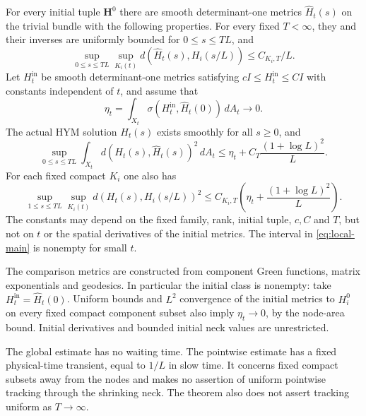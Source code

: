 \begin{theorem}\label{thm:main}
For every initial tuple $\mathbf H^0$ there are smooth determinant-one
metrics $\widehat H_t(s)$ on the trivial bundle with the following
properties. For every fixed $T<\infty$, they and their inverses are
uniformly bounded for $0\le s\le TL$, and
\begin{equation}\label{eq:approx-thick-intro}
 \sup_{0\le s\le TL}\sup_{K_i(t)}
 d(\widehat H_t(s),H_i(s/L))\le C_{K_i,T}/L.
\end{equation}
Let $H_t^{\mathrm{in}}$ be smooth determinant-one metrics satisfying
$cI\le H_t^{\mathrm{in}}\le CI$ with constants independent of $t$, and
assume that
\[
 \eta_t=\int_{X_t}\sigma(H_t^{\mathrm{in}},\widehat H_t(0))\,dA_t
 \longrightarrow0.
\]
The actual HYM solution $H_t(s)$ exists smoothly for all $s\ge0$, and
\begin{equation}\label{eq:global-main}
 \sup_{0\le s\le TL}\int_{X_t}d(H_t(s),\widehat H_t(s))^2\,dA_t
 \le\eta_t+C_T\frac{(1+\log L)^2}{L}.
\end{equation}
For each fixed compact $K_i$ one also has
\begin{equation}\label{eq:local-main}
 \sup_{1\le s\le TL}\sup_{K_i(t)}d(H_t(s),H_i(s/L))^2
 \le C_{K_i,T}\left(\eta_t+\frac{(1+\log L)^2}{L}\right).
\end{equation}
The constants may depend on the fixed family, rank, initial tuple,
$c,C$ and $T$, but not on $t$ or the spatial derivatives of the initial
metrics. The interval in \eqref{eq:local-main} is nonempty for small $t$.
\end{theorem}

The comparison metrics are constructed from component Green functions,
matrix exponentials and geodesics. In particular the initial class is
nonempty: take $H_t^{\mathrm{in}}=\widehat H_t(0)$. Uniform bounds and
$L^2$ convergence of the initial metrics to $H_i^0$ on every fixed
compact component subset also imply $\eta_t\to0$, by the node-area bound.
Initial derivatives and bounded initial neck values are unrestricted.

The global estimate has no waiting time. The pointwise estimate has a
fixed physical-time transient, equal to $1/L$ in slow time. It concerns
fixed compact subsets away from the nodes and makes no assertion of
uniform pointwise tracking through the shrinking neck. The theorem also
does not assert tracking uniform as $T\to\infty$.

